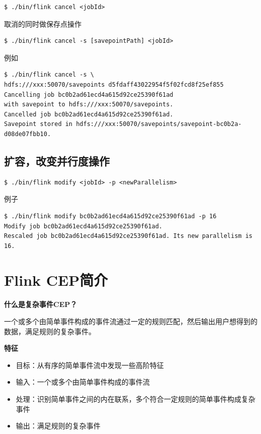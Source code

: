 \documentclass[cn,11pt,chinese]{elegantbook}
\begin{document}
\begin{verbatim}
$ ./bin/flink cancel <jobId>
\end{verbatim}

取消的同时做保存点操作

\begin{verbatim}
$ ./bin/flink cancel -s [savepointPath] <jobId>
\end{verbatim}

例如

\begin{verbatim}
$ ./bin/flink cancel -s \
hdfs:///xxx:50070/savepoints d5fdaff43022954f5f02fcd8f25ef855
Cancelling job bc0b2ad61ecd4a615d92ce25390f61ad 
with savepoint to hdfs:///xxx:50070/savepoints.
Cancelled job bc0b2ad61ecd4a615d92ce25390f61ad. 
Savepoint stored in hdfs:///xxx:50070/savepoints/savepoint-bc0b2a-d08de07fbb10.
\end{verbatim}

\section{扩容，改变并行度操作}

\begin{verbatim}
$ ./bin/flink modify <jobId> -p <newParallelism>
\end{verbatim}

例子

\begin{verbatim}
$ ./bin/flink modify bc0b2ad61ecd4a615d92ce25390f61ad -p 16
Modify job bc0b2ad61ecd4a615d92ce25390f61ad.
​Rescaled job bc0b2ad61ecd4a615d92ce25390f61ad. Its new parallelism is 16.
\end{verbatim}

\chapter{Flink CEP简介}

\textbf{什么是复杂事件CEP？}

一个或多个由简单事件构成的事件流通过一定的规则匹配，然后输出用户想得到的数据，满足规则的复杂事件。

\textbf{特征}

\begin{itemize}
    \item 目标：从有序的简单事件流中发现一些高阶特征
    \item 输入：一个或多个由简单事件构成的事件流
    \item 处理：识别简单事件之间的内在联系，多个符合一定规则的简单事件构成复杂事件
    \item 输出：满足规则的复杂事件
\end{itemize}
\end{document}
